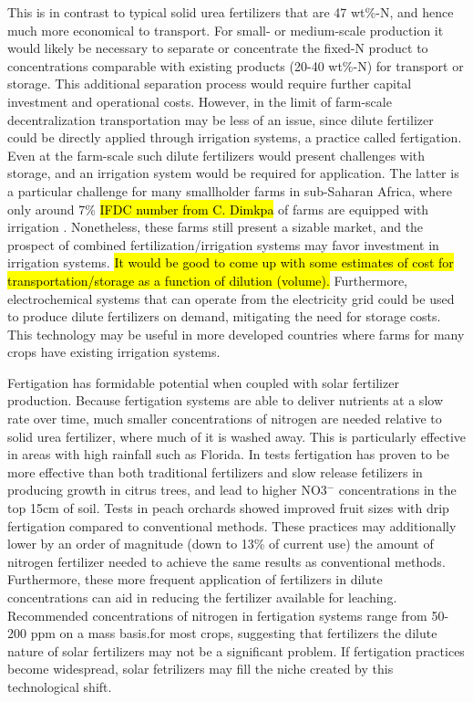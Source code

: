 This is in contrast to typical solid urea fertilizers that are 47 wt\%-N, and hence much more economical to transport. For small- or medium-scale production it would likely be necessary to separate or concentrate the fixed-N product to concentrations comparable with existing products (20-40 wt\%-N) for transport or storage. This additional separation process would require further capital investment and operational costs. However, in the limit of farm-scale decentralization transportation may be less of an issue, since dilute fertilizer could be directly applied through irrigation systems, a practice called fertigation. Even at the farm-scale such dilute fertilizers would present challenges with storage, and an irrigation system would be required for application. The latter is a particular challenge for many smallholder farms in sub-Saharan Africa, where only around 7\% \hl{IFDC number from C. Dimkpa} of farms are equipped with irrigation \needcite. Nonetheless, these farms still present a sizable market, and the prospect of combined fertilization/irrigation systems may favor investment in irrigation systems. \hl{It would be good to come up with some estimates of cost for transportation/storage as a function of dilution (volume).} Furthermore, electrochemical systems that can operate from the electricity grid could be used to produce dilute fertilizers on demand, mitigating the need for storage costs. This technology may be useful in more developed countries where farms for many crops have existing irrigation systems.

Fertigation has formidable potential when coupled with solar fertilizer production. Because fertigation systems are able to deliver nutrients at a slow rate over time, much smaller concentrations of nitrogen are needed relative to solid urea fertilizer, where much of it is washed away. This is particularly effective in areas with high rainfall such as Florida.\cite{kadyampakeni_2015} In tests fertigation has proven to be more effective than both traditional fertilizers and slow release fetilizers in producing growth in citrus trees\cite{Morgan2009}, and lead to higher NO3$^-$ concentrations in the top 15cm of soil\cite{Willis1991}. Tests in peach orchards showed improved fruit sizes with drip fertigation compared to conventional methods.\cite{Bryla2005} These practices may additionally lower by an order of magnitude (down to 13\% of current use) the amount of nitrogen fertilizer needed to achieve the same results as conventional methods\cite{kadyampakeni_2015}. Furthermore, these more frequent application of fertilizers in dilute concentrations can aid in reducing the fertilizer available for leaching. Recommended concentrations of nitrogen in fertigation systems range from 50-200 ppm on a mass basis.\needcite for most crops, suggesting that fertilizers the dilute nature of solar fertilizers may not be a significant problem. If fertigation practices become widespread, solar fetrilizers may fill the niche created by this technological shift. 

